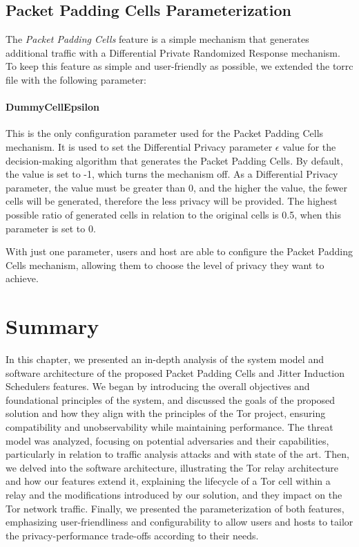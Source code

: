 \subsection{Packet Padding Cells Parameterization}\label{sec:packet_padding_parameterization}

The \textit{Packet Padding Cells} feature is a simple mechanism that generates additional traffic with a Differential Private Randomized Response mechanism. To keep this feature as simple and user-friendly as possible, we extended the torrc file with the following parameter:

\paragraph{DummyCellEpsilon} This is the only configuration parameter used for the Packet Padding Cells mechanism. It is used to set the Differential Privacy parameter $\epsilon$ value for the decision-making algorithm that generates the Packet Padding Cells. By default, the value is set to -1, which turns the mechanism off. As a Differential Privacy parameter, the value must be greater than 0, and the higher the value, the fewer cells will be generated, therefore the less privacy will be provided. The highest possible ratio of generated cells in relation to the original cells is 0.5, when this parameter is set to 0.

With just one parameter, users and host are able to configure the Packet Padding Cells mechanism, allowing them to choose the level of privacy they want to achieve. 


\section{Summary}\label{sec:architeture_discussion}

In this chapter, we presented an in-depth analysis of the system model and software architecture of the proposed Packet Padding Cells and Jitter Induction Schedulers features. We began by introducing the overall objectives and foundational principles of the system, and discussed the goals of the proposed solution and how they align with the principles of the Tor project, ensuring compatibility and unobservability while maintaining performance. The threat model was analyzed, focusing on potential adversaries and their capabilities, particularly in relation to traffic analysis attacks and with state of the art. Then, we delved into the software architecture, illustrating the Tor relay architecture and how our features extend it, explaining the lifecycle of a Tor cell within a relay and the modifications introduced by our solution, and they impact on the Tor network traffic. Finally, we presented the parameterization of both features, emphasizing user-friendliness and configurability to allow users and hosts to tailor the privacy-performance trade-offs according to their needs.

